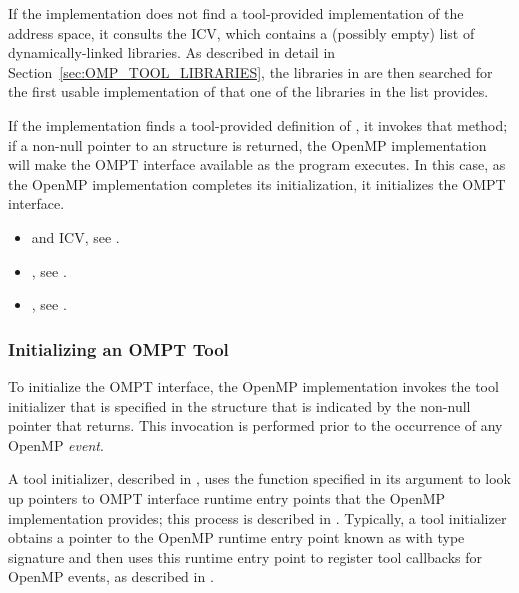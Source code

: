 If the implementation does not find a tool-provided implementation of 
 the address space, it consults the  
ICV, which contains a (possibly empty) list of dynamically-linked libraries. As 
described in detail in Section~\ref{sec:OMP_TOOL_LIBRARIES}, the libraries in
 are then searched for the first usable implementation 
of  that one of the libraries in the list provides.

If the implementation finds a tool-provided definition of ,
it invokes that method; if a non-null pointer to an  
structure is returned, the OpenMP implementation will make the OMPT interface 
available as the program executes. In this case, as the OpenMP implementation 
completes its initialization, it initializes the OMPT interface.

\crossreferences
\begin{itemize}
\item {} and  ICV, see .
\item {}, see .
\item {}, see .
\end{itemize}

\subsubsection{Initializing an OMPT Tool}
\label{sec:tool-initialize}

To initialize the OMPT interface, the OpenMP implementation invokes the tool 
initializer that is specified in the  structure
that is indicated by the non-null pointer that  returns.
This invocation is performed prior to the occurrence of any OpenMP \emph{event}.

A tool initializer, described in , uses the function 
specified in its  argument to look up pointers to OMPT interface runtime 
entry points that the OpenMP implementation provides; this process is described in 
. Typically, a tool initializer obtains a pointer to the 
OpenMP runtime entry point known as  with type signature
 and then uses this runtime entry point to register tool 
callbacks for OpenMP events, as described in .

